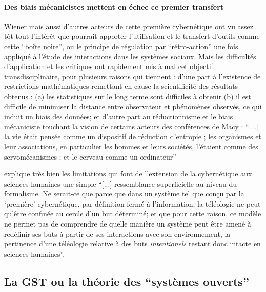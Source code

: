 \paragraph{Des biais mécanicistes mettent en échec ce premier transfert}

Wiener mais aussi d'autres acteurs de cette première cybernétique ont vu assez tôt tout l'intérêt que pourrait apporter l'utilisation et le transfert d'outils comme cette \enquote{boîte noire}, ou le principe de régulation par \enquote{rétro-action} une fois appliqué à l'étude des interactions dans les systèmes sociaux. Mais les difficultés d'application et les critiques ont rapidement mis à mal cet objectif transdisciplinaire, pour plusieurs raisons qui tiennent : d'une part à l'existence de restrictions mathématiques remettant en cause la scientificité des résultats obtenus : (a) les statistiques sur le long terme sont difficiles à obtenir (b) il est  difficile de minimiser la distance entre observateur et phénomènes observés, ce qui induit un biais des données; et d'autre part au réductionnisme et le biais mécaniciste touchant la vision de certains acteurs des conférences de Macy  : \enquote{[...] la vie était pensée comme un dispositif de réduction d'entropie ; les organismes et leur associations, en particulier les hommes et leurs sociétés, l'étaient comme des servomécanismes ; et le cerveau comme un ordinateur} \autocite[784]{Pouvreau2013}

\autocite[782]{Pouvreau2013} explique très bien les limitations qui font de l'extension de la cybernétique aux sciences humaines une simple \enquote{[...] ressemblance superficielle au niveau du formalisme. Ne serait-ce que parce que dans un système tel que conçu par la \enquote{première} cybernétique, par définition fermé à l'information, la téléologie ne peut qu'être confinée au cercle d'un but déterminé; et que pour cette raison, ce modèle ne permet pas de comprendre de quelle manière un système peut être amené à redéfinir ses buts à partir de ses interactions avec son environnement, la pertinence d'une téléologie relative à des buts \textit{intentionels} restant donc intacte en sciences humaines}.

\subsection{La GST ou la théorie des \enquote{systèmes ouverts}}
\label{subsec:gst}


